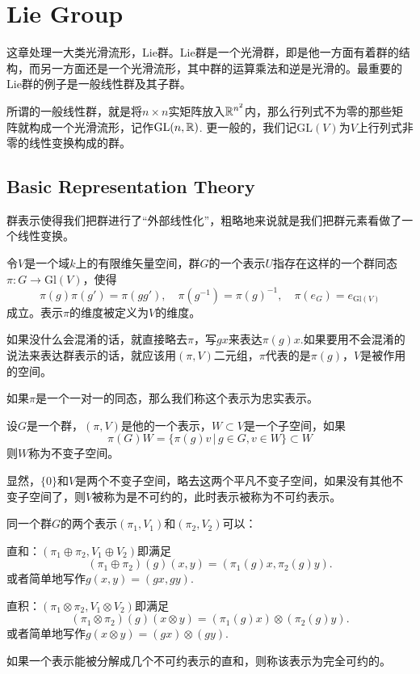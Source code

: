 \chapter{Lie Group}

这章处理一大类光滑流形，Lie群。Lie群是一个光滑群，即是他一方面有着群的结构，而另一方面还是一个光滑流形，其中群的运算乘法和逆是光滑的。最重要的Lie群的例子是一般线性群及其子群。

所谓的一般线性群，就是将$n\times n$实矩阵放入$\mathbb{R}^{n^2}$内，那么行列式不为零的那些矩阵就构成一个光滑流形，记作$\mathrm{GL}(n,\mathbb{R})$. 更一般的，我们记$\mathrm{GL}(V)$为$V$上行列式非零的线性变换构成的群。

\section{Basic Representation Theory}

群表示使得我们把群进行了“外部线性化”，粗略地来说就是我们把群元素看做了一个线性变换。

\para 令$V$是一个域$k$上的有限维矢量空间，群$G$的一个表示$U$指存在这样的一个群同态$\pi:G\rightarrow \mathrm{Gl}(V)$，使得
\[
	\pi(g)\pi(g')=\pi(gg'),\quad \pi(g^{-1})=\pi(g)^{-1},\quad \pi(e_G)=e_{\mathrm{Gl}(V)}
\]
成立。表示$\pi$的维度被定义为$V$的维度。

如果没什么会混淆的话，就直接略去$\pi$，写$gx$来表达$\pi(g)x$.如果要用不会混淆的说法来表达群表示的话，就应该用$(\pi,V)$二元组，$\pi$代表的是$\pi(g)$，$V$是被作用的空间。

如果$\pi$是一个一对一的同态，那么我们称这个表示为忠实表示。

\para 设$G$是一个群，$(\pi,V)$是他的一个表示，$W\subset V$是一个子空间，如果
\[
\pi(G)W=\{\pi(g)v\,|\,g\in G,v\in W\}\subset W
\]
则$W$称为不变子空间。

显然，$\{0\}$和$V$是两个不变子空间，略去这两个平凡不变子空间，如果没有其他不变子空间了，则$V$被称为是不可约的，此时表示被称为不可约表示。

\para 同一个群$G$的两个表示$(\pi_1,V_1)$和$(\pi_2,V_2)$可以：

 直和：$(\pi_1\oplus \pi_2,V_1\oplus V_2)$即满足
\[
	(\pi_1\oplus \pi_2)(g)(x,y)=(\pi_1(g)x,\pi_2(g)y).
\]
或者简单地写作$g(x,y)=(gx,gy)$.

 直积：$(\pi_1\otimes \pi_2,V_1\otimes V_2)$即满足
\[
	(\pi_1\otimes \pi_2)(g)(x\otimes y)=(\pi_1(g)x)\otimes (\pi_2(g)y).
\]
或者简单地写作$g(x\otimes y)=(gx)\otimes(gy)$.

\para 如果一个表示能被分解成几个不可约表示的直和，则称该表示为完全可约的。

